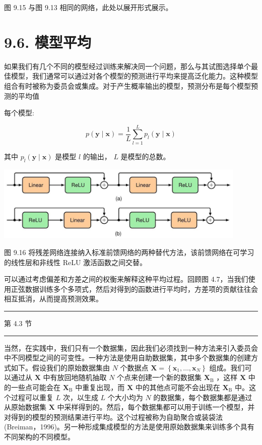 \documentclass[10pt]{report}
\newcommand{\HRule}{\begin{center}\rule{0.9\linewidth}{0.2mm}\end{center}}
\begin{document}
图 9.15 与图 9.13 相同的网络，此处以展开形式展示。

\section*{9.6. 模型平均}

如果我们有几个不同的模型经过训练来解决同一个问题，那么与其试图选择单个最佳模型，我们通常可以通过对各个模型的预测进行平均来提高泛化能力。这种模型组合有时被称为委员会或集成。对于产生概率输出的模型，预测分布是每个模型预测的平均值

每个模型:

\[
p\left( {\mathbf{y} \mid  \mathbf{x}}\right)  = \frac{1}{L}\mathop{\sum }\limits_{{l = 1}}^{L}{p}_{l}\left( {\mathbf{y} \mid  \mathbf{x}}\right)  \tag{9.42}
\]

其中 \({p}_{l}\left( {\mathbf{y} \mid  \mathbf{x}}\right)\) 是模型 \(l\) 的输出， \(L\) 是模型的总数。

\begin{center}
\includegraphics[max width=0.9\textwidth]{images/0194e279-9b28-703a-88f4-c3ac21e2010d_296_304_1509_1186_359_0.jpg}
\end{center}
\hspace*{3em} 

图 9.16 将残差网络连接纳入标准前馈网络的两种替代方法，该前馈网络在可学习的线性层和非线性 ReLU 激活函数之间交替。

可以通过考虑偏差和方差之间的权衡来解释这种平均过程。回顾图 4.7，当我们使用正弦数据训练多个多项式，然后对得到的函数进行平均时，方差项的贡献往往会相互抵消，从而提高预测效果。

\HRule

第 4.3 节

\HRule

当然，在实践中，我们只有一个数据集，因此我们必须找到一种方法来引入委员会中不同模型之间的可变性。一种方法是使用自助数据集，其中多个数据集的创建方式如下。假设我们的原始数据集由 \(N\) 个数据点 \(\mathbf{X} = \left\{  {{\mathbf{x}}_{1},\ldots ,{\mathbf{x}}_{N}}\right\}\) 组成。我们可以通过从 \(\mathbf{X}\) 中有放回地随机抽取 \(N\) 个点来创建一个新的数据集 \({\mathbf{X}}_{\mathrm{B}}\) ，这样 \(\mathbf{X}\) 中的一些点可能会在 \({\mathbf{X}}_{\mathrm{B}}\) 中重复出现，而 \(\mathbf{X}\) 中的其他点可能不会出现在 \({\mathbf{X}}_{\mathrm{B}}\) 中。这个过程可以重复 \(L\) 次，以生成 \(L\) 个大小均为 \(N\) 的数据集，每个数据集都是通过从原始数据集 \(\mathbf{X}\) 中采样得到的。然后，每个数据集都可以用于训练一个模型，并对得到的模型的预测结果进行平均。这个过程被称为自助聚合或装袋法(Breiman，1996)。另一种形成集成模型的方法是使用原始数据集来训练多个具有不同架构的不同模型。
\end{document}
